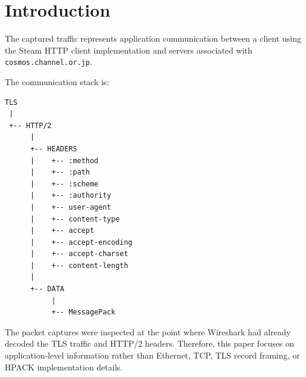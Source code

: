 \section{Introduction}

The captured traffic represents application communication between a client
using the Steam HTTP client implementation and servers associated with
\texttt{cosmos.channel.or.jp}.

The communication stack is:

\begin{lstlisting}
TLS
 |
 +-- HTTP/2
      |
      +-- HEADERS
      |    +-- :method
      |    +-- :path
      |    +-- :scheme
      |    +-- :authority
      |    +-- user-agent
      |    +-- content-type
      |    +-- accept
      |    +-- accept-encoding
      |    +-- accept-charset
      |    +-- content-length
      |
      +-- DATA
           |
           +-- MessagePack
\end{lstlisting}

The packet captures were inspected at the point where Wireshark had already
decoded the TLS traffic and HTTP/2 headers.  Therefore, this paper focuses
on application-level information rather than Ethernet, TCP, TLS record
framing, or HPACK implementation details.

\newpage